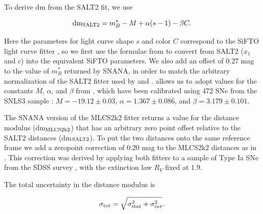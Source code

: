  To derive dm from the SALT2 fit, we
use

\begin{equation} \label{eqn:dmSALT2}
 {\rm dm}_{\rm SALT2} = m_B^* - M + \alpha(s-1) - \beta C.
\end{equation}

\noindent  Here the parameters for light curve shape $s$ and color $C$ 
correspond to the SiFTO light curve fitter \citep{Conley:2008}, so we
first use the formulae from \citet{Guy:2010} to convert from SALT2
($x_1$ and $c$) into the equivalent SiFTO parameters.  We also add an
offset of 0.27 mag to the value of $m_B^*$ returned by SNANA, in order
to match the arbitrary normalization of the SALT2 fitter used
by \citet{Guy:2010} and \citet{Sullivan:2011}.   allows
us to adopt values for the constants $M$, $\alpha$, and $\beta$
from \citet{Sullivan:2011}, which have been calibrated using 472 SNe
from the SNLS3 sample \citep{Conley:2011}: $M=-19.12\pm0.03$,
$\alpha=1.367\pm0.086$, and $\beta=3.179\pm0.101$.



The SNANA version of the MLCS2k2 fitter returns a value for the
distance modulus (dm$_{\rm MLCS2k2}$) that has an arbitrary zero point
offset relative to the SALT2 distances (dm$_{\rm SALT2}$).  To put the
two distances onto the same reference frame we add a zeropoint
correction of 0.20 mag to the MLCS2k2 distances as
in \citealt{Patel:2014}.  This correction was derived by applying both
fitters to a sample of Type Ia SNe from the SDSS
survey \citep{Holtzman:2008,Kessler:2009b}, with the extinction law
$R_V$ fixed at 1.9.

The total uncertainty in the distance modulus is  

\begin{equation} \label{eqn:sigmatot}
 \sigma_{\rm tot} = \sqrt{ \sigma_{\rm stat}^2 + \sigma_{int}^2}.
\end{equation}

